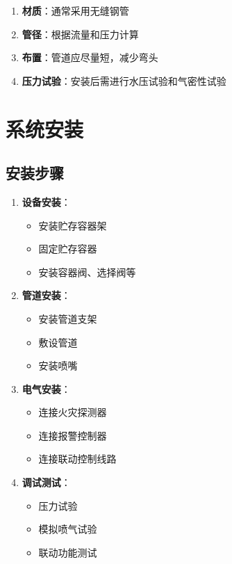 \documentclass[12pt,UTF8]{ctexbook}
\begin{document}
\begin{enumerate}
    \item \textbf{材质}：通常采用无缝钢管
    \item \textbf{管径}：根据流量和压力计算
    \item \textbf{布置}：管道应尽量短，减少弯头
    \item \textbf{压力试验}：安装后需进行水压试验和气密性试验
\end{enumerate}

\chapter{系统安装}

\section{安装步骤}

\begin{enumerate}
    \item \textbf{设备安装}：
    \begin{itemize}[leftmargin=2em]
        \item 安装贮存容器架
        \item 固定贮存容器
        \item 安装容器阀、选择阀等
    \end{itemize}
    
    \item \textbf{管道安装}：
    \begin{itemize}[leftmargin=2em]
        \item 安装管道支架
        \item 敷设管道
        \item 安装喷嘴
    \end{itemize}
    
    \item \textbf{电气安装}：
    \begin{itemize}[leftmargin=2em]
        \item 连接火灾探测器
        \item 连接报警控制器
        \item 连接联动控制线路
    \end{itemize}
    
    \item \textbf{调试测试}：
    \begin{itemize}[leftmargin=2em]
        \item 压力试验
        \item 模拟喷气试验
        \item 联动功能测试
    \end{itemize}
\end{enumerate}
\end{document}
